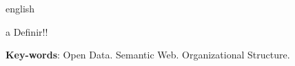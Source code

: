 \begin{resumo}[Abstract]
  \begin{otherlanguage*}{english} 
  
a Definir!!
  
  \vspace{\onelineskip}
 
  \noindent 
  \textbf{Key-words}: Open Data. Semantic Web. Organizational Structure.
  \end{otherlanguage*}
\end{resumo}


